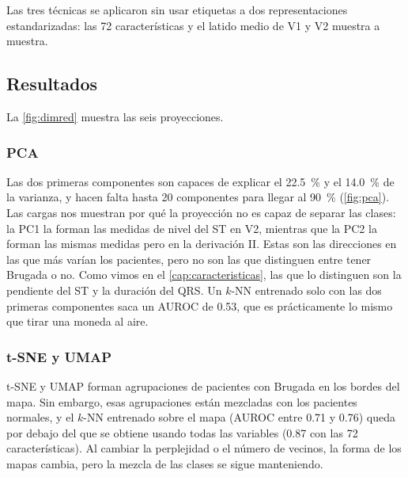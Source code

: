 Las tres técnicas se aplicaron sin usar etiquetas a dos representaciones estandarizadas: las 72 características y el latido medio de V1 y V2 muestra a muestra.

\subsection{Resultados}

La \cref{fig:dimred} muestra las seis proyecciones.


\subsubsection{PCA}

Las dos primeras componentes son capaces de explicar el \SI{22.5}{\percent} y el \SI{14.0}{\percent} de la varianza, y hacen falta hasta 20 componentes para llegar al \SI{90}{\percent} (\cref{fig:pca}). Las cargas nos muestran por qué la proyección no es capaz de separar las clases: la PC1 la forman las medidas de nivel del ST en V2, mientras que la PC2 la forman las mismas medidas pero en la derivación II. Estas son las direcciones en las que más varían los pacientes, pero no son las que distinguen entre tener Brugada o no. Como vimos en el \cref{cap:caracteristicas}, las que lo distinguen son la pendiente del ST y la duración del QRS. Un $k$-NN entrenado solo con las dos primeras componentes saca un AUROC de \num{0.53}, que es prácticamente lo mismo que tirar una moneda al aire.


\subsubsection{t-SNE y UMAP}

t-SNE y UMAP forman agrupaciones de pacientes con Brugada en los bordes del mapa. Sin embargo, esas agrupaciones están mezcladas con los pacientes normales, y el $k$-NN entrenado sobre el mapa (AUROC entre \num{0.71} y \num{0.76}) queda por debajo del que se obtiene usando todas las variables (\num{0.87} con las 72 características). Al cambiar la perplejidad o el número de vecinos, la forma de los mapas cambia, pero la mezcla de las clases se sigue manteniendo.


